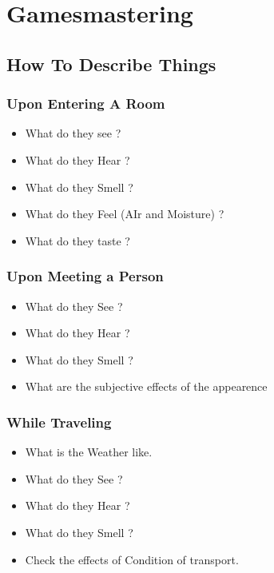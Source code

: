 \chapter{Gamesmastering}

\section{How To Describe Things}

\subsection{Upon Entering A Room}

\begin{itemize}
    \item What do they see ?
    \item What do they Hear ?
    \item What do they Smell ?
    \item What do they Feel (AIr and Moisture) ?
    \item What do they taste ?
\end{itemize}

\subsection{Upon Meeting a Person }

\begin{itemize}
    \item What do they See ? 
    \item What do they Hear ?
    \item What do they Smell ?
    \item What are the subjective effects of the appearence
\end{itemize}

\subsection{While Traveling}

\begin{itemize}
    \item What is the Weather like.
    \item What do they See ? 
    \item What do they Hear ?
    \item What do they Smell ?
	\item Check the effects of Condition of transport.
\end{itemize}

